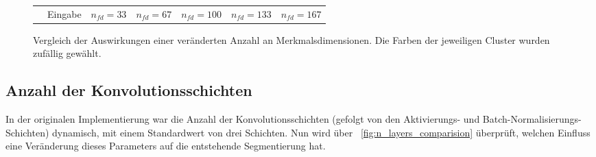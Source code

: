 \begin{figure}[h!]
\begin{tabular}{m{15pt}m{}m{}m{}m{}m{}m{}}
		&
		\vspace*{2pt}\centering Eingabe & 
		\vspace*{2pt}\centering $n_{fd}=33$ &
		\vspace*{2pt}\centering $n_{fd}=67$ &
		\vspace*{2pt}\centering $n_{fd}=100$ &
		\vspace*{2pt}\centering $n_{fd}=133$ &
		\vspace*{2pt}\centering $n_{fd}=167$ \\
	\end{tabular}
	\caption{Vergleich der Auswirkungen einer veränderten Anzahl an Merkmalsdimensionen. Die Farben der jeweiligen Cluster wurden zufällig gewählt.}
	\label{fig:fd_comparision}
\end{figure}
\fi
\subsection{Anzahl der Konvolutionsschichten}

In der originalen Implementierung war die Anzahl der Konvolutionsschichten (gefolgt von den Aktivierungs- und Batch-Normalisierungs-Schichten) dynamisch, mit einem Standardwert von drei Schichten. Nun wird über \figurename~\ref{fig:n_layers_comparision} überprüft, welchen Einfluss eine Veränderung dieses Parameters auf die entstehende Segmentierung hat.

